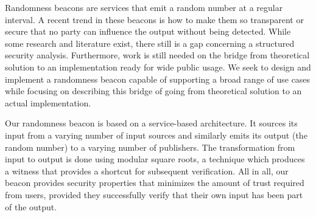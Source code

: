 Randomness beacons are services that emit a random number at a regular interval.
A recent trend in these beacons is how to make them so transparent or secure that no party can influence the output without being detected. While some research and literature exist, there still is a gap concerning a structured security analysis.
Furthermore, work is still needed on the bridge from theoretical solution to an implementation ready for wide public usage.
We seek to design and implement a randomness beacon capable of supporting a broad range of use cases while focusing on describing this bridge of going from theoretical solution to an actual implementation.%

Our randomness beacon is based on a service-based architecture. It sources its input from a varying number of input sources and similarly emits its output (the random number) to a varying number of publishers. The transformation from input to output is done using modular square roots, a technique which produces a witness that provides a shortcut for subsequent verification. All in all, our beacon provides security properties that minimizes the amount of trust required from users, provided they successfully verify that their own input has been part of the output.
